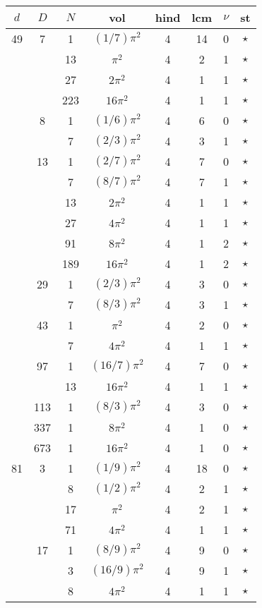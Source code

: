 \begin{tabular}{ccc|ccccc}
$d$ & $D$ & $N$ & vol & hind & lcm & $\nu$ & st\\
\hline
49 & 7 & 1 & $(1/7)\pi^2$ & 4 & 14 & 0 & $\star$ \\
 &  & 13 & $\pi^2$ & 4 & 2 & 1 & $\star$ \\
 &  & 27 & $2\pi^2$ & 4 & 1 & 1 & $\star$ \\
 &  & 223 & $16\pi^2$ & 4 & 1 & 1 & $\star$ \\
 & 8 & 1 & $(1/6)\pi^2$ & 4 & 6 & 0 & $\star$ \\
 &  & 7 & $(2/3)\pi^2$ & 4 & 3 & 1 & $\star$ \\
 & 13 & 1 & $(2/7)\pi^2$ & 4 & 7 & 0 & $\star$ \\
 &  & 7 & $(8/7)\pi^2$ & 4 & 7 & 1 & $\star$ \\
 &  & 13 & $2\pi^2$ & 4 & 1 & 1 & $\star$ \\
 &  & 27 & $4\pi^2$ & 4 & 1 & 1 & $\star$ \\
 &  & 91 & $8\pi^2$ & 4 & 1 & 2 & $\star$ \\
 &  & 189 & $16\pi^2$ & 4 & 1 & 2 & $\star$ \\
 & 29 & 1 & $(2/3)\pi^2$ & 4 & 3 & 0 & $\star$ \\
 &  & 7 & $(8/3)\pi^2$ & 4 & 3 & 1 & $\star$ \\
 & 43 & 1 & $\pi^2$ & 4 & 2 & 0 & $\star$ \\
 &  & 7 & $4\pi^2$ & 4 & 1 & 1 & $\star$ \\
 & 97 & 1 & $(16/7)\pi^2$ & 4 & 7 & 0 & $\star$ \\
 &  & 13 & $16\pi^2$ & 4 & 1 & 1 & $\star$ \\
 & 113 & 1 & $(8/3)\pi^2$ & 4 & 3 & 0 & $\star$ \\
 & 337 & 1 & $8\pi^2$ & 4 & 1 & 0 & $\star$ \\
 & 673 & 1 & $16\pi^2$ & 4 & 1 & 0 & $\star$ \\
81 & 3 & 1 & $(1/9)\pi^2$ & 4 & 18 & 0 & $\star$ \\
 &  & 8 & $(1/2)\pi^2$ & 4 & 2 & 1 & $\star$ \\
 &  & 17 & $\pi^2$ & 4 & 2 & 1 & $\star$ \\
 &  & 71 & $4\pi^2$ & 4 & 1 & 1 & $\star$ \\
 & 17 & 1 & $(8/9)\pi^2$ & 4 & 9 & 0 & $\star$ \\
 &  & 3 & $(16/9)\pi^2$ & 4 & 9 & 1 & $\star$ \\
 &  & 8 & $4\pi^2$ & 4 & 1 & 1 & $\star$ \\

\end{tabular}
